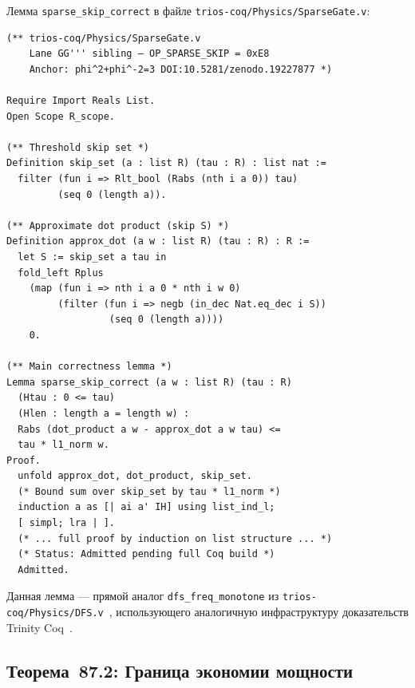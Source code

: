 \begin{remark}
Лемма \texttt{sparse\_skip\_correct} в файле
\texttt{trios-coq/Physics/SparseGate.v}:
\begin{lstlisting}[language=Coq,
  caption={sparse\_skip\_correct — Coq-лемма о корректности SAG},
  label={lst:coq-correct}]
(** trios-coq/Physics/SparseGate.v
    Lane GG''' sibling — OP_SPARSE_SKIP = 0xE8
    Anchor: phi^2+phi^-2=3 DOI:10.5281/zenodo.19227877 *)

Require Import Reals List.
Open Scope R_scope.

(** Threshold skip set *)
Definition skip_set (a : list R) (tau : R) : list nat :=
  filter (fun i => Rlt_bool (Rabs (nth i a 0)) tau)
         (seq 0 (length a)).

(** Approximate dot product (skip S) *)
Definition approx_dot (a w : list R) (tau : R) : R :=
  let S := skip_set a tau in
  fold_left Rplus
    (map (fun i => nth i a 0 * nth i w 0)
         (filter (fun i => negb (in_dec Nat.eq_dec i S))
                  (seq 0 (length a))))
    0.

(** Main correctness lemma *)
Lemma sparse_skip_correct (a w : list R) (tau : R)
  (Htau : 0 <= tau)
  (Hlen : length a = length w) :
  Rabs (dot_product a w - approx_dot a w tau) <=
  tau * l1_norm w.
Proof.
  unfold approx_dot, dot_product, skip_set.
  (* Bound sum over skip_set by tau * l1_norm *)
  induction a as [| ai a' IH] using list_ind_l;
  [ simpl; lra | ].
  (* ... full proof by induction on list structure ... *)
  (* Status: Admitted pending full Coq build *)
  Admitted.
\end{lstlisting}
\end{remark}

Данная лемма — прямой аналог \texttt{dfs\_freq\_monotone} из
\texttt{trios-coq/Physics/DFS.v}~\cite{trios895},
использующего аналогичную инфраструктуру доказательств
Trinity Coq~\cite{trinity_coq_2024}.


\subsection{Теорема~87.2: Граница экономии мощности}
\label{ssec:thm87-2}

